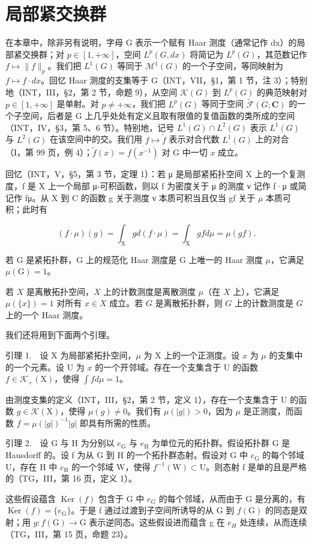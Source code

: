 \chapter{局部紧交换群}

在本章中，除非另有说明，字母 G 表示一个赋有 Haar 测度（通常记作 dx）的局部紧交换群；对 \(p \in [1, +\infty]\)，空间 \(L^{p}(G, dx)\) 将简记为 \(L^{p}(G)\)，其范数记作 \(f \mapsto \|f\|_{p}\)。我们把 \(L^{1}(G)\) 等同于 \(\mathcal{M}^{1}(G)\) 的一个子空间，等同映射为 \(f \mapsto f \cdot dx\)。回忆 Haar 测度的支集等于 G（INT，VII，§1，第 1 节，注 3）；特别地（INT，III，§2，第 2 节，命题 9），从空间 \(\mathcal{K}(G)\) 到 \(L^{p}(G)\) 的典范映射对 \(p \in [1, +\infty]\) 是单射。对 \(p \neq +\infty\)，我们把 \(L^{p}(G)\) 等同于空间 \(\widetilde{\mathcal{F}}(G; \mathbf{C})\) 的一个子空间，后者是 G 上几乎处处有定义且取有限值的复值函数的类所成的空间（INT，IV，§3，第 5、6 节）。特别地，记号 \(L^{1}(G) \cap L^{2}(G)\) 表示 \(L^{1}(G)\) 与 \(L^{2}(G)\) 在该空间中的交。我们用 \(f \mapsto \widetilde{f}\) 表示对合代数 \(L^{1}(G)\) 上的对合（I，第 99 页，例 4）；\(\widetilde{f}(x) = \overline{f(x^{-1})}\) 对 G 中一切 \(x\) 成立。

回忆（INT，V，§5，第 3 节，定理 1）：若 μ 是局部紧拓扑空间 X 上的一个复测度，f 是 X 上一个局部 μ-可积函数，则以 f 为密度关于 μ 的测度 ν 记作 f·μ 或简记作 fμ。从 X 到 C 的函数 g 关于测度 ν 本质可积当且仅当 gf 关于 \(\mu\) 本质可积；此时有

\[
(f \cdot \mu) (g) = \int_ {\mathrm{X}} g d (f \cdot \mu) = \int_ {\mathrm{X}} g f d \mu = \mu (g f).
\]

若 G 是紧拓扑群，G 上的规范化 Haar 测度是 G 上唯一的 Haar 测度 \(\mu\)，它满足 \(\mu(\mathrm{G}) = 1\)。

若 \(X\) 是离散拓扑空间，\(X\) 上的计数测度是离散测度 \(\mu\)（在 \(X\) 上），它满足 \(\mu(\{x\}) = 1\) 对所有 \(x \in X\) 成立。若 \(G\) 是离散拓扑群，则 \(G\) 上的计数测度是 \(G\) 上的一个 Haar 测度。

我们还将用到下面两个引理。

引理 1.　设 X 为局部紧拓扑空间，\(\mu\) 为 X 上的一个正测度。设 \(x\) 为 \(\mu\) 的支集中的一个元素。设 U 为 \(x\) 的一个开邻域。存在一个支集含于 U 的函数 \(f \in \mathcal{K}_{+}(\mathrm{X})\)，使得 \(\int fd\mu = 1\)。

由测度支集的定义（INT，III，§2，第 2 节，定义 1），存在一个支集含于 U 的函数 \(g \in \mathcal{K}(\mathrm{X})\)，使得 \(\mu(g) \neq 0\)。我们有 \(\mu(|g|) > 0\)，因为 \(\mu\) 是正测度，而函数 \(f = \mu(|g|)^{-1}|g|\) 即具有所需的性质。

引理 2.　设 G 与 H 为分别以 \(e_{\mathrm{G}}\) 与 \(e_{\mathrm{H}}\) 为单位元的拓扑群。假设拓扑群 G 是 Hausdorff 的。设 f 为从 G 到 H 的一个拓扑群态射。假设对 G 中 \(e_{\mathrm{G}}\) 的每个邻域 U，存在 H 中 \(e_{\mathrm{H}}\) 的一个邻域 W，使得 \(f^{-1}(\mathrm{W}) \subset \mathrm{U}\)。则态射 f 是单的且是严格的（TG，III，第 16 页，定义 1）。

这些假设蕴含 \(\operatorname{Ker}(f)\) 包含于 G 中 \(e_{G}\) 的每个邻域，从而由于 G 是分离的，有 \(\operatorname{Ker}(f) = \{e_{\mathrm{G}}\}\)。于是 f 通过过渡到子空间所诱导的从 G 到 \(f(\mathrm{G})\) 的同态是双射；用 \(g: f(\mathrm{G}) \to \mathrm{G}\) 表示逆同态。这些假设进而蕴含 g 在 \(e_{H}\) 处连续，从而连续（TG，III，第 15 页，命题 23）。

